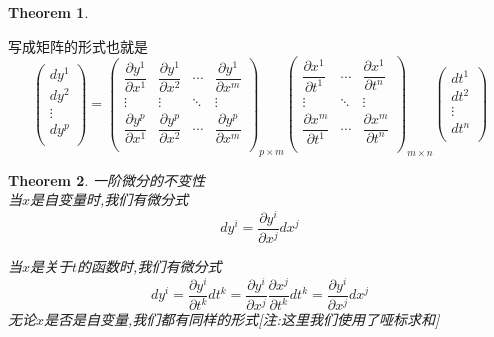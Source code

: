 \documentclass[11pt,hyperref,a4paper,UTF8]{ctexart}
\newtheorem{theorem}{Theorem}[subsection]
\begin{document}
\begin{CJK}{UTF8}{gkai}
\begin{theorem}
\end{theorem}
写成矩阵的形式也就是
\[\begin{pmatrix}
  dy^1\\
  dy^2\\
  \vdots\\
  dy^p\\
\end{pmatrix} = \begin{pmatrix}
  \dfrac{\partial y^1}{\partial x^1}&\dfrac{\partial y^1}{\partial x^2}&\cdots&\dfrac{\partial y^1}{\partial x^m}\\
  \vdots&\vdots&\ddots&\vdots\\
  \dfrac{\partial y^p}{\partial x^1}&\dfrac{\partial y^p}{\partial x^2}&\cdots&\dfrac{\partial y^p}{\partial x^m}\\
\end{pmatrix}_{p \times m} \begin{pmatrix}
  \dfrac{\partial x^1}{\partial t^1}&\cdots&\dfrac{\partial x^1}{\partial t^n}\\
  \vdots&\ddots&\vdots\\
  \dfrac{\partial x^m}{\partial t^1}&\cdots&\dfrac{\partial x^m}{\partial t^n}\\
\end{pmatrix}_{m \times n} \begin{pmatrix}
  dt^1\\
  dt^2\\
  \vdots\\
  dt^n\\
\end{pmatrix}\]

\begin{theorem}
  一阶微分的不变性\\

  当$x$是自变量时,我们有微分式
  \[d y^i = \frac{\partial y^i}{\partial x^j} d x^j\]

  当$x$是关于$t$的函数时,我们有微分式
  \[d y^i = \frac{\partial y^i}{\partial t^k} d t^k = \frac{\partial y^i}{\partial x^j}\frac{\partial x^j}{\partial t^k} d t^k = \frac{\partial y^i}{\partial x^j} dx^j\]
  无论$x$是否是自变量,我们都有同样的形式[注:这里我们使用了哑标求和]
\end{theorem}


\end{CJK}
\end{document}
